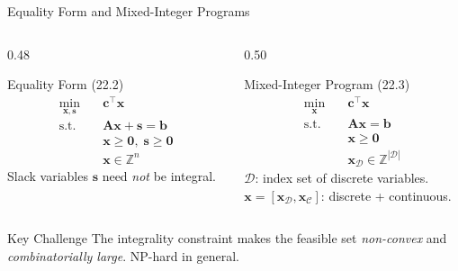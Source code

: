 \documentclass[aspectratio=169,10pt]{beamer}
\newcommand{\bx}{\mathbf{x}}
\newcommand{\bc}{\mathbf{c}}
\newcommand{\bb}{\mathbf{b}}
\newcommand{\bA}{\mathbf{A}}
\newcommand{\bs}{\mathbf{s}}
\newcommand{\ZZ}{\mathbb{Z}}
\begin{document}
\begin{frame}{Equality Form and Mixed-Integer Programs}
  \begin{columns}
    \begin{column}{0.48\textwidth}
      \begin{block}{Equality Form (22.2)}
        \[
          \begin{aligned}
            \underset{\bx,\bs}{\min} & \quad \bc^\top\bx \\
            \text{s.t.} & \quad \bA\bx + \bs = \bb \\
                        & \quad \bx \geq \mathbf{0},\; \bs \geq \mathbf{0} \\
                        & \quad \bx \in \ZZ^n
          \end{aligned}
        \]
        Slack variables $\bs$ need \emph{not} be integral.
      \end{block}
    \end{column}
    \begin{column}{0.50\textwidth}
      \begin{block}{Mixed-Integer Program (22.3)}
        \[
          \begin{aligned}
            \underset{\bx}{\min} & \quad \bc^\top\bx \\
            \text{s.t.} & \quad \bA\bx = \bb \\
                        & \quad \bx \geq \mathbf{0} \\
                        & \quad \bx_{\mathcal{D}} \in \ZZ^{|\mathcal{D}|}
          \end{aligned}
        \]
        $\mathcal{D}$: index set of discrete variables. \\
        $\bx = [\bx_{\mathcal{D}}, \bx_{\mathcal{C}}]$: discrete + continuous.
      \end{block}
    \end{column}
  \end{columns}
  \vspace{4pt}
  \begin{alertblock}{Key Challenge}
    The integrality constraint makes the feasible set \emph{non-convex} and
    \emph{combinatorially large}. NP-hard in general.
  \end{alertblock}
\end{frame}
\end{document}
